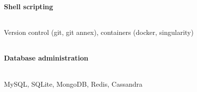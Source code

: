 \documentclass[margin]{res}
\begin{document}
\begin{resume}
\textbf{Shell scripting}\\
\vspace{-2.5em}\\
\begin{adjustwidth}{5mm}{}
Version control (git, git annex), containers (docker, singularity)\\
\end{adjustwidth}
\vspace{-2em}\\

\textbf{Database administration}\\
\vspace{-2.5em}\\
\begin{adjustwidth}{5mm}{}
MySQL, SQLite, MongoDB, Redis, Cassandra\\
\end{adjustwidth}
\vspace{-2em}\\


\end{resume}
\end{document}
